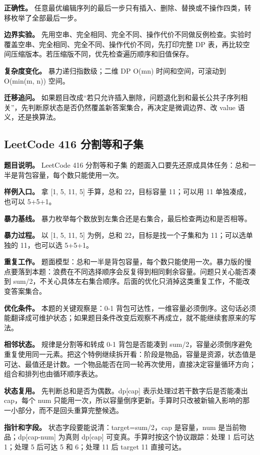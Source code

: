 \textbf{正确性。} 任意最优编辑序列的最后一步只有插入、删除、替换或不操作四类，转移枚举了全部最后一步。

\textbf{边界实验。} 先用空串、完全相同、完全不同、操作代价不同做反例检查。实验时覆盖空串、完全相同、完全不同、操作代价不同，先打印完整 DP 表，再比较空间压缩版本。若压缩版不同，优先检查遍历顺序和旧值保存。

\textbf{复杂度变化。} 暴力递归指数级；二维 DP O(mn) 时间和空间，可滚动到 O(min(m, n)) 空间。

\textbf{迁移追问。} 如果题目改成“若只允许插入删除，问题退化到和最长公共子序列相关”，先判断原状态是否仍然覆盖新答案集合，再决定是微调边界、改 value 语义，还是换算法。

\subsection{LeetCode 416 分割等和子集}

\textbf{题目说明。} LeetCode 416 分割等和子集 的题面入口要先还原成具体任务：总和一半是背包容量，每个数只能使用一次。

\textbf{样例入口。} 拿 [1, 5, 11, 5] 手算，总和 22，目标容量 11；可以用 11 单独凑成，也可以 5+5+1。

\textbf{暴力基线。} 暴力枚举每个数放到左集合还是右集合，最后检查两边和是否相等。

\textbf{暴力过程。} 以 [1, 5, 11, 5] 为例，总和 22，目标是找一个子集和为 11；可以选单独的 11，也可以选 5+5+1。

\textbf{重复工作。} 题面模型：总和一半是背包容量，每个数只能使用一次。暴力版的慢点要落到本题：浪费在不同选择顺序会反复得到相同剩余容量。问题只关心能否凑到 sum/2，不关心具体左右集合顺序。后面的优化只消掉这类重复工作，不能改变答案集合。

\textbf{优化条件。} 本题的关键观察是：0-1 背包可达性，一维容量必须倒序。这句话必须能翻译成可维护状态；如果题目条件改变后观察不再成立，就不能继续套原来的写法。

\textbf{相邻状态。} 规律是分割等和转成 0-1 背包是否能凑到 sum/2，容量必须倒序避免重复使用同一元素。把这个特例继续拆开看：阶段是物品，容量是资源，状态值是可达、最值还是计数。一个物品能否在同一轮再次使用，直接决定容量循环方向；组合和排列也由循环顺序表达。

\textbf{状态复用。} 先判断总和是否为偶数。dp[cap] 表示处理过若干数字后是否能凑出 cap，每个 num 只能用一次，所以容量倒序更新。手算时只改被新输入影响的那一小部分，而不是回头重算完整候选。

\textbf{指针和字段。} 状态字段要能说清：target=sum/2，cap 是容量，num 是当前物品；dp[cap-num] 为真则 dp[cap] 可变真。手算时按这个协议跟踪：处理 1 后可达 1；处理 5 后可达 5 和 6；处理 11 后 target 11 直接可达。

